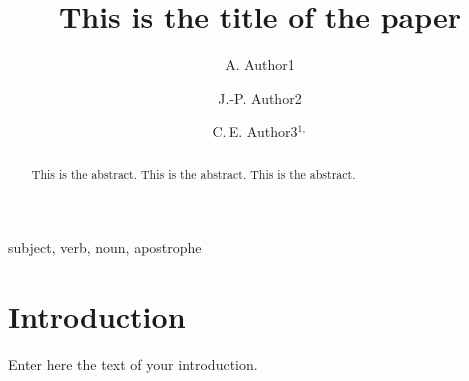 \documentclass{sf2a-conf2022}
\begin{document}


\title{This is the title of the paper}


\author{A. Author1}\address{Timberland Observatory, 34560 City, Neverland}

\author{J.-P. Author2}\address{Institute XYZ, 1299 City, OtherLand}



\author{C.\,E. Author3$^{1,}$}\address{Dept. of Chess, University of Games, 35101 Las Vegas, Monaco} 


\setcounter{page}{237}




\maketitle


\begin{abstract}
This is the abstract. This is the abstract. This is the abstract.
\end{abstract}


\begin{keywords}
subject, verb, noun, apostrophe
\end{keywords}



\section{Introduction}
  Enter here the text of your introduction.
  
\end{document}
